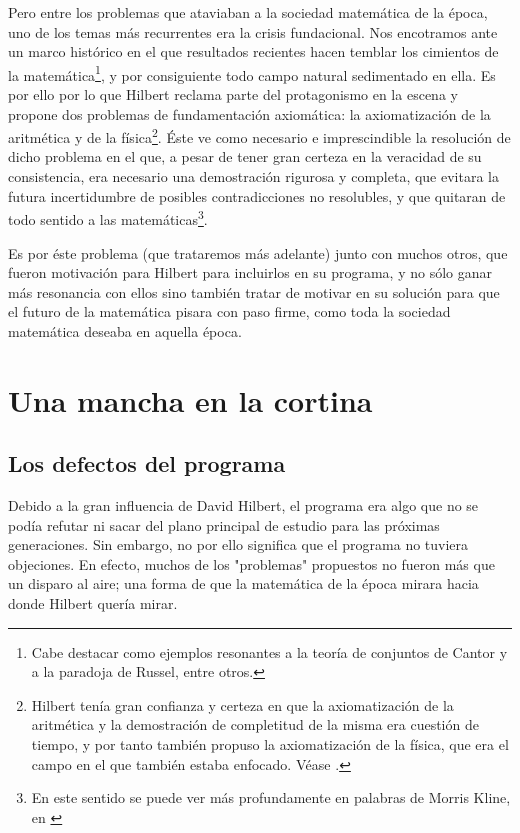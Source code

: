 Pero entre los problemas que ataviaban a la sociedad matemática de la época, uno de los temas más recurrentes era la crisis fundacional. Nos encotramos ante un marco histórico 
en el que resultados recientes hacen temblar los cimientos de la matemática\footnote{Cabe destacar como ejemplos resonantes a la teoría de conjuntos de Cantor y a la paradoja 
de Russel, entre otros.}, y por consiguiente todo campo natural sedimentado en ella. Es por ello por lo que Hilbert reclama parte del protagonismo en la escena y propone dos problemas
de fundamentación axiomática: la axiomatización de la aritmética y de la física\footnote{Hilbert tenía gran confianza y certeza en que la axiomatización de la aritmética y la demostración de 
completitud de la misma era cuestión de tiempo, y por tanto también propuso la axiomatización de la física, que era el campo en el que también estaba enfocado. Véase \cite{kreisel1976have}.}.
Éste ve como necesario e imprescindible la resolución de dicho problema en el que, a pesar de tener gran certeza en la veracidad de su consistencia, era necesario una demostración rigurosa
y completa, que evitara la futura incertidumbre de posibles contradicciones no resolubles, y que quitaran de todo sentido a las matemáticas\footnote{En este sentido se puede ver más profundamente 
en palabras de Morris Kline, en \cite{kline2000matematicas}}.

Es por éste problema (que trataremos más adelante) junto con muchos otros, que fueron motivación para Hilbert para incluirlos en su programa, y no sólo ganar más resonancia con ellos sino 
también tratar de motivar en su solución para que el futuro de la matemática pisara con paso firme, como toda la sociedad matemática deseaba en aquella época.

\chapter{Una mancha en la cortina} \label{ch:Hilbert-2}

\section{Los defectos del programa}

Debido a la gran influencia de David Hilbert, el programa era algo que no se podía refutar ni sacar del plano principal de estudio para las próximas generaciones. Sin embargo,
no por ello significa que el programa no tuviera objeciones. En efecto, muchos de los "problemas" propuestos no fueron más que un disparo al aire; una forma de que la matemática 
de la época mirara hacia donde Hilbert quería mirar. 

